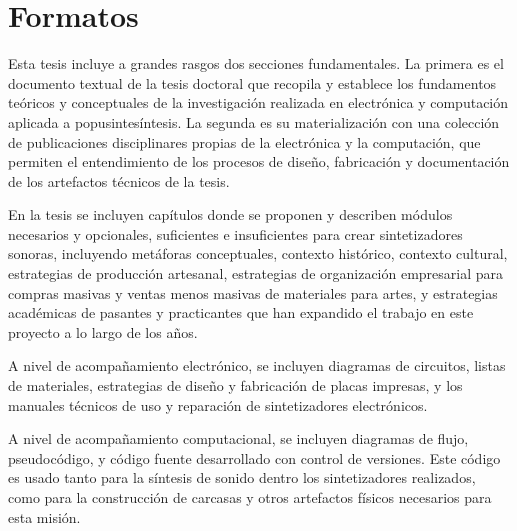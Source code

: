 \documentclass[../proyecto.tex]{subfiles}
\begin{document}
\section{Formatos}



Esta tesis incluye a grandes rasgos dos secciones fundamentales. La primera es el documento textual de la tesis doctoral que recopila y establece los fundamentos teóricos y conceptuales de la investigación realizada en electrónica y computación aplicada a popusintesíntesis. La segunda es su materialización con una colección de publicaciones disciplinares propias de la electrónica y la computación, que permiten el entendimiento de los procesos de diseño, fabricación y documentación de los artefactos técnicos de la tesis.

En la tesis se incluyen capítulos donde se proponen y describen módulos necesarios y opcionales, suficientes e insuficientes para crear sintetizadores sonoras, incluyendo metáforas conceptuales, contexto histórico, contexto cultural, estrategias de producción artesanal, estrategias de organización empresarial para compras masivas y ventas menos masivas de materiales para artes, y estrategias académicas de pasantes y practicantes que han expandido el trabajo en este proyecto a lo largo de los años.

A nivel de acompañamiento electrónico, se incluyen diagramas de circuitos, listas de materiales, estrategias de diseño y fabricación de placas impresas, y los manuales técnicos de uso y reparación de sintetizadores electrónicos.

A nivel de acompañamiento computacional, se incluyen diagramas de flujo, pseudocódigo, y código fuente desarrollado con control de versiones. Este código es usado tanto para la síntesis de sonido dentro los sintetizadores realizados, como para la construcción de carcasas y otros artefactos físicos necesarios para esta misión.
\end{document}
